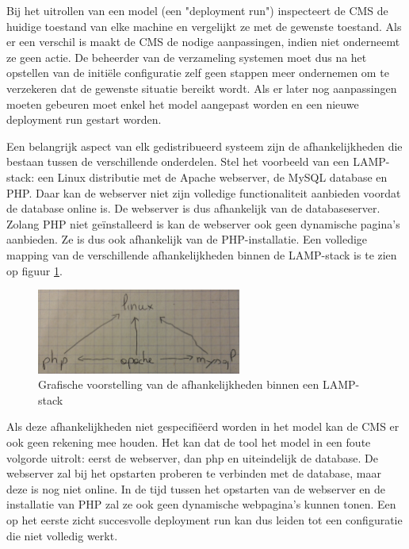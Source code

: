 Bij het uitrollen van een model (een "deployment run") inspecteert de CMS de huidige toestand van elke machine en vergelijkt ze met de gewenste toestand.
Als er een verschil is maakt de CMS de nodige aanpassingen, indien niet onderneemt ze geen actie.
De beheerder van de verzameling systemen moet dus na het opstellen van de initi\"ele configuratie zelf geen stappen meer ondernemen om te verzekeren dat de gewenste situatie bereikt wordt.
Als er later nog aanpassingen moeten gebeuren moet enkel het model aangepast worden en een nieuwe deployment run gestart worden.

Een belangrijk aspect van elk gedistribueerd systeem zijn de afhankelijkheden die bestaan tussen de verschillende onderdelen.
Stel het voorbeeld van een LAMP-stack: een Linux distributie met de Apache webserver, de MySQL database en PHP.
Daar kan de webserver niet zijn volledige functionaliteit aanbieden voordat de database online is.
De webserver is dus afhankelijk van de databaseserver.
Zolang PHP niet ge\"installeerd is kan de webserver ook geen dynamische pagina's aanbieden.
Ze is dus ook afhankelijk van de PHP-installatie.
Een volledige mapping van de verschillende afhankelijkheden binnen de LAMP-stack is te zien op figuur \ref{fig:lamp_dep}.
\begin{figure}
    \begin{center}
    \includegraphics[width=0.6\textwidth]{images/lamp_dep.png}
    \caption{Grafische voorstelling van de afhankelijkheden binnen een LAMP-stack}
    \label{fig:lamp_dep}
    \end{center}
\end{figure}

Als deze afhankelijkheden niet gespecifi\"eerd worden in het model kan de CMS er ook geen rekening mee houden.
Het kan dat de tool het model in een foute volgorde uitrolt: eerst de webserver, dan php en uiteindelijk de database.
De webserver zal bij het opstarten proberen te verbinden met de database, maar deze is nog niet online.
In de tijd tussen het opstarten van de webserver en de installatie van PHP zal ze ook geen dynamische webpagina's kunnen tonen.
Een op het eerste zicht succesvolle deployment run kan dus leiden tot een configuratie die niet volledig werkt.

